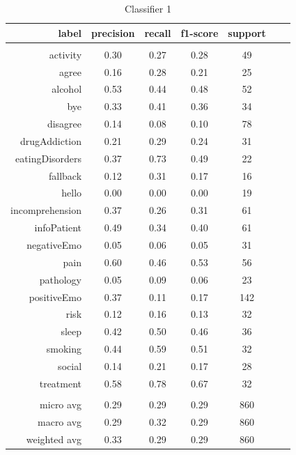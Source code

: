 \documentclass[11pt]{article}
\begin{document}
\begin{table}[htb]
\begin{center}
\begin{tabular}{ |r|c|c|c|c|c|c| }
label 			& precision & recall & f1-score & support\\ \hline 
\\ \hline 
activity 		&  0.30 & 0.27 & 0.28 &   49\\ \hline 
agree 			&  0.16 & 0.28 & 0.21 &   25\\ \hline 
alcohol 		&  0.53 & 0.44 & 0.48 &   52\\ \hline 
bye 			&  0.33 & 0.41 & 0.36 &   34\\ \hline 
disagree 		&  0.14 & 0.08 & 0.10 &   78\\ \hline 
drugAddiction 	&  0.21 & 0.29 & 0.24 &   31\\ \hline 
eatingDisorders &  0.37 & 0.73 & 0.49 &   22\\ \hline 
fallback 		&  0.12 & 0.31 & 0.17 &   16\\ \hline 
hello 			&  0.00 & 0.00 & 0.00 &   19\\ \hline 
incomprehension &  0.37 & 0.26 & 0.31 &   61\\ \hline 
infoPatient 	&  0.49 & 0.34 & 0.40 &   61\\ \hline 
negativeEmo 	&  0.05 & 0.06 & 0.05 &   31\\ \hline 
pain 			&  0.60 & 0.46 & 0.53 &   56\\ \hline 
pathology 		&  0.05 & 0.09 & 0.06 &   23\\ \hline 
positiveEmo 	&  0.37 & 0.11 & 0.17 &  142\\ \hline 
risk 			&  0.12 & 0.16 & 0.13 &   32\\ \hline 
sleep 			&  0.42 & 0.50 & 0.46 &   36\\ \hline 
smoking 		&  0.44 & 0.59 & 0.51 &   32\\ \hline 
social 			&  0.14 & 0.21 & 0.17 &   28\\ \hline 
treatment 		&  0.58 & 0.78 & 0.67 &   32\\ \hline 
\\ \hline 
micro avg 		&  0.29 & 0.29 & 0.29 &  860\\ \hline 
macro avg 		&  0.29 & 0.32 & 0.29 &  860\\ \hline 
weighted avg 	&  0.33 & 0.29 & 0.29 &  860\\ \hline
\end{tabular}
\caption{Classifier 1}
\end{center}
\end{table}
\FloatBarrier
\end{document}

